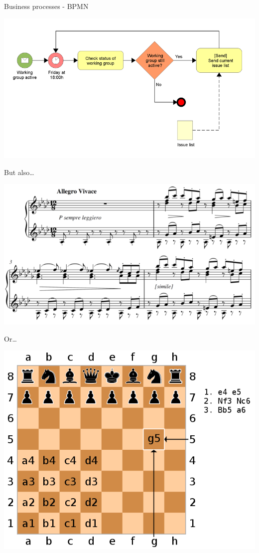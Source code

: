 \documentclass[presentation]{beamer}
\begin{document}
\begin{frame}[label={sec:orgaf70dce}]{Business processes - BPMN}
\begin{center}
\includegraphics[width=.9\linewidth]{./images/BPMN.png}
\end{center}
\end{frame}

\begin{frame}[label={sec:org149dff1}]{But also\ldots{}}
\begin{center}
\includegraphics[width=.9\linewidth]{./images/MusicNotation-External.png}
\end{center}
\end{frame}

\begin{frame}[label={sec:org00fe4f2}]{Or\ldots{}}
\begin{center}
\includegraphics[width=.9\linewidth]{./images/ChessNotation.png}
\end{center}
\end{frame}
\end{document}
